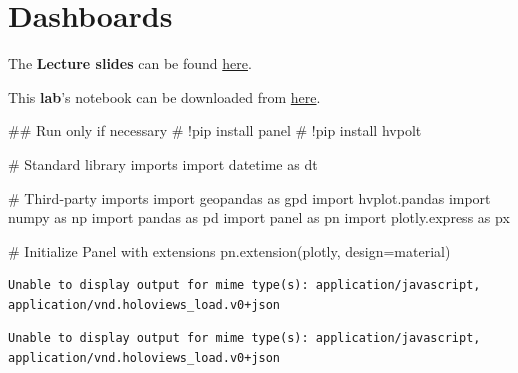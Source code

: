 \documentclass[
  letterpaper,
  DIV=11,
  numbers=noendperiod]{scrreprt}
\newenvironment{Shaded}{\begin{snugshade}}{\end{snugshade}}
\newcommand{\CommentTok}[1]{\textcolor[rgb]{0.37,0.37,0.37}{#1}}
\newcommand{\ImportTok}[1]{\textcolor[rgb]{0.00,0.46,0.62}{#1}}
\newcommand{\NormalTok}[1]{\textcolor[rgb]{0.00,0.23,0.31}{#1}}
\newcommand{\OperatorTok}[1]{\textcolor[rgb]{0.37,0.37,0.37}{#1}}
\newcommand{\StringTok}[1]{\textcolor[rgb]{0.13,0.47,0.30}{#1}}
\begin{document}

\chapter{Dashboards}\label{dashboards}

The \textbf{Lecture slides} can be found
\href{https://github.com/GDSL-UL/wma/raw/main/lectures/w08.pdf}{here}.

This \textbf{lab}'s notebook can be downloaded from
\href{https://github.com/GDSL-UL/wma/blob/main/labs/w08_dashboards.ipynb}{here}.

\begin{Shaded}
\begin{Highlighting}[]
\CommentTok{\#\# Run only if necessary}
\CommentTok{\# !pip install panel}
\CommentTok{\# !pip install hvpolt}
\end{Highlighting}
\end{Shaded}

\begin{Shaded}
\begin{Highlighting}[]
\CommentTok{\# Standard library imports}
\ImportTok{import}\NormalTok{ datetime }\ImportTok{as}\NormalTok{ dt}

\CommentTok{\# Third{-}party imports}
\ImportTok{import}\NormalTok{ geopandas }\ImportTok{as}\NormalTok{ gpd}
\ImportTok{import}\NormalTok{ hvplot.pandas}
\ImportTok{import}\NormalTok{ numpy }\ImportTok{as}\NormalTok{ np}
\ImportTok{import}\NormalTok{ pandas }\ImportTok{as}\NormalTok{ pd}
\ImportTok{import}\NormalTok{ panel }\ImportTok{as}\NormalTok{ pn}
\ImportTok{import}\NormalTok{ plotly.express }\ImportTok{as}\NormalTok{ px}

\CommentTok{\# Initialize Panel with extensions}
\NormalTok{pn.extension(}\StringTok{\textquotesingle{}plotly\textquotesingle{}}\NormalTok{, design}\OperatorTok{=}\StringTok{\textquotesingle{}material\textquotesingle{}}\NormalTok{)}
\end{Highlighting}
\end{Shaded}

\begin{verbatim}
Unable to display output for mime type(s): application/javascript, application/vnd.holoviews_load.v0+json
\end{verbatim}

\begin{verbatim}
Unable to display output for mime type(s): application/javascript, application/vnd.holoviews_load.v0+json
\end{verbatim}
\end{document}
